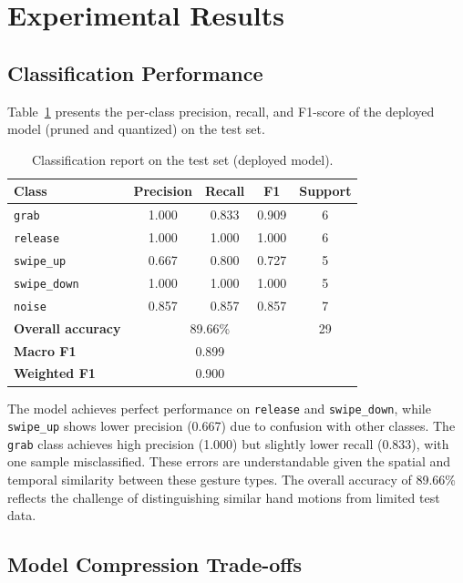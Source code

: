 \section{Experimental Results}
\label{sec:results}

\subsection{Classification Performance}

Table~\ref{tab:classification} presents the per-class precision, recall,
and F1-score of the deployed model (pruned and quantized) on the test set.

\begin{table}[ht]
\centering
\caption{Classification report on the test set (deployed model).}
\label{tab:classification}
\begin{tabular}{@{}lcccc@{}}
\toprule
\textbf{Class} & \textbf{Precision} & \textbf{Recall} & \textbf{F1} & \textbf{Support} \\
\midrule
\texttt{grab}        & 1.000 & 0.833 & 0.909 & 6 \\
\texttt{release}     & 1.000 & 1.000 & 1.000 & 6 \\
\texttt{swipe\_up}   & 0.667 & 0.800 & 0.727 & 5 \\
\texttt{swipe\_down} & 1.000 & 1.000 & 1.000 & 5 \\
\texttt{noise}       & 0.857 & 0.857 & 0.857 & 7 \\
\midrule
\textbf{Overall accuracy} & \multicolumn{3}{c}{89.66\%} & 29 \\
\textbf{Macro F1} & \multicolumn{3}{c}{0.899} & \\
\textbf{Weighted F1} & \multicolumn{3}{c}{0.900} & \\
\bottomrule
\end{tabular}
\end{table}

The model achieves perfect performance on \texttt{release} and
\texttt{swipe\_down}, while \texttt{swipe\_up} shows lower precision
(0.667) due to confusion with other classes. The \texttt{grab} class
achieves high precision (1.000) but slightly lower recall (0.833),
with one sample misclassified. These errors are understandable given
the spatial and temporal similarity between these gesture types.
The overall accuracy of 89.66\% reflects the challenge of
distinguishing similar hand motions from limited test data.

\subsection{Model Compression Trade-offs}

